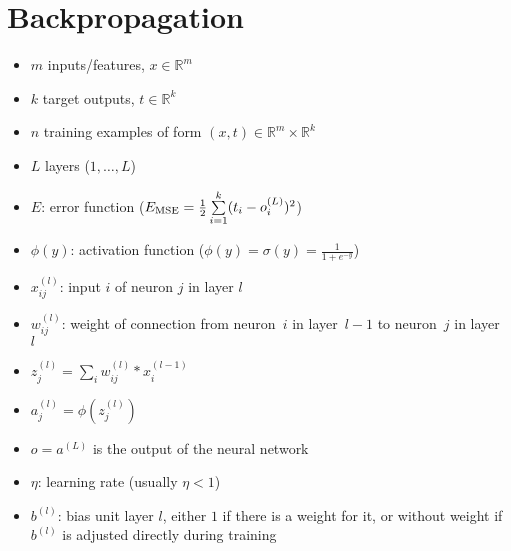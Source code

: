 \section{Backpropagation}\label{sec:backpropagation}
\begin{itemize}
\item $m$ inputs/features, $x \in \mathbb{R}^m$
\item $k$ target outputs, $t \in \mathbb{R}^k$
\item $n$ training examples of form $(x, t) \in \mathbb{R}^m \times \mathbb{R}^k$
\item $L$ layers ($1,\dots,L$)
\item $E$: error function (\eg $E_\text{MSE} = \frac{1}{2} \sum\limits_{i=1}^k (t_i - o_i^{(L)})^2$)
\item $\phi(y)$: activation function (\eg $\phi(y) = \sigma(y) = \frac{1}{1 + e^{-y}}$)
\item $x_{ij}^{(l)}$: input $i$ of neuron $j$ in layer $l$
\item $w_{ij}^{(l)}$: weight of connection from neuron~$i$ in layer~$l-1$ to neuron~$j$ in layer~$l$
\item $z_j^{(l)} = \sum\limits_i w_{ij}^{(l)} * x_i^{(l-1)}$
\item $a_j^{(l)} = \phi(z_j^{(l)})$
\item $o = a^{(L)}$ is the output of the neural network
\item $\eta$: learning rate (usually $\eta < 1$)
\item $b^{(l)}$: bias unit layer $l$, either $1$ if there is a weight for it, or without weight if $b^{(l)}$ is adjusted directly during training
\end{itemize}

